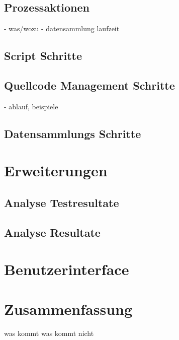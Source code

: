 \subsection{Prozessaktionen}

- was/wozu
- datensammlung laufzeit

\subsection{Script Schritte}

\subsection{Quellcode Management Schritte}

- ablauf, beispiele

\subsection{Datensammlungs Schritte}

\section{Erweiterungen}
\subsection{Analyse Testresultate}
\subsection{Analyse Resultate}


\section{Benutzerinterface}



\section{Zusammenfassung}

was kommt
was kommt nicht
